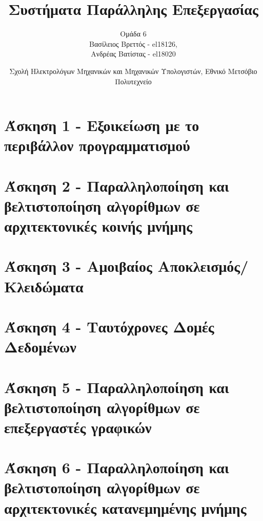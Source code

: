 \documentclass[letterpaper,12pt]{article}
\begin{document}
\title{Συστήματα Παράλληλης Επεξεργασίας}
\author{Ομάδα 6 \\
Βασίλειος Βρεττός - el18126, \\
Ανδρέας Βατίστας - el18020 \\}
\date{Σχολή Ηλεκτρολόγων Μηχανικών και Μηχανικών Υπολογιστών, Εθνικό Μετσόβιο Πολυτεχνείο}
\maketitle

\section{Άσκηση 1 - Εξοικείωση με το περιβάλλον προγραμματισμού}


\section{Άσκηση 2 - Παραλληλοποίηση και βελτιστοποίηση αλγορίθμων σε αρχιτεκτονικές κοινής μνήμης}


\section{Άσκηση 3 - Αμοιβαίος Αποκλεισμός/Κλειδώματα}


\section{Άσκηση 4 - Ταυτόχρονες Δομές Δεδομένων}


\section{Άσκηση 5 - Παραλληλοποίηση και βελτιστοποίηση αλγορίθμων σε επεξεργαστές γραφικών}


\section{Άσκηση 6 - Παραλληλοποίηση και βελτιστοποίηση αλγορίθμων σε αρχιτεκτονικές κατανεμημένης μνήμης}

\end{document}

